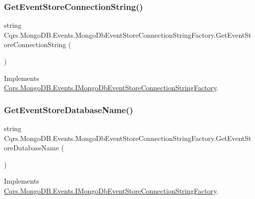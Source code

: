 \subsubsection{\texorpdfstring{Get\+Event\+Store\+Connection\+String()}{GetEventStoreConnectionString()}}
{\footnotesize\ttfamily string Cqrs.\+Mongo\+D\+B.\+Events.\+Mongo\+Db\+Event\+Store\+Connection\+String\+Factory.\+Get\+Event\+Store\+Connection\+String (\begin{DoxyParamCaption}{ }\end{DoxyParamCaption})}



Implements \hyperlink{interfaceCqrs_1_1MongoDB_1_1Events_1_1IMongoDbEventStoreConnectionStringFactory_a3860ea4bf6793b081f03fb7cc1dcbb27_a3860ea4bf6793b081f03fb7cc1dcbb27}{Cqrs.\+Mongo\+D\+B.\+Events.\+I\+Mongo\+Db\+Event\+Store\+Connection\+String\+Factory}.

\mbox{\label{classCqrs_1_1MongoDB_1_1Events_1_1MongoDbEventStoreConnectionStringFactory_a282bda17095c8ea293f5305ea0d1b83c_a282bda17095c8ea293f5305ea0d1b83c}} 
\subsubsection{\texorpdfstring{Get\+Event\+Store\+Database\+Name()}{GetEventStoreDatabaseName()}}
{\footnotesize\ttfamily string Cqrs.\+Mongo\+D\+B.\+Events.\+Mongo\+Db\+Event\+Store\+Connection\+String\+Factory.\+Get\+Event\+Store\+Database\+Name (\begin{DoxyParamCaption}{ }\end{DoxyParamCaption})}



Implements \hyperlink{interfaceCqrs_1_1MongoDB_1_1Events_1_1IMongoDbEventStoreConnectionStringFactory_a81ee28bfbb0e567b95f2b280bc6fb298_a81ee28bfbb0e567b95f2b280bc6fb298}{Cqrs.\+Mongo\+D\+B.\+Events.\+I\+Mongo\+Db\+Event\+Store\+Connection\+String\+Factory}.



